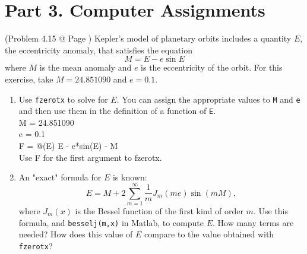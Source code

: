\documentclass[10pt]{report}
\begin{document}
\section*{Part 3. Computer Assignments}
(Problem 4.15 @ Page )
Kepler's model of planetary orbits includes a quantity $E$, the eccentricity anomaly, that satisfies the equation
\[
M = E - e\sin E
\]
where $M$ is the mean anomaly and $e$ is the eccentricity of the orbit. For this exercise, take $M = 24.851090$ and $e = 0.1$.
\begin{enumerate}
	\item 
	Use \texttt{fzerotx} to solve for $E$. You can assign the appropriate values to \texttt{M} and \texttt{e} and then use them in the definition of a function of \texttt{E}.\\
	M = 24.851090\\
	e = 0.1\\
	F = @(E) E - e*sin(E) - M\\
	Use F for the first argument to fzerotx.
	
	\item 
	An "exact" formula for $E$ is known:
	\[
	E = M + 2\sum_{m=1}^{\infty} \frac{1}{m}J_m(me)\sin(mM),
	\]
	where $J_m(x)$ is the Bessel function of the first kind of order $m$. Use this formula, and \texttt{besselj(m,x)} in Matlab, to compute $E$. How many terms are needed? How does this value of $E$ compare to the value obtained with \texttt{fzerotx}?
\end{enumerate}
\end{document}
